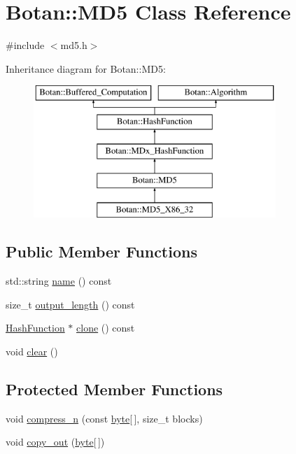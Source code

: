 \hypertarget{classBotan_1_1MD5}{\section{Botan\-:\-:M\-D5 Class Reference}
\label{classBotan_1_1MD5}
}


{\ttfamily \#include $<$md5.\-h$>$}

Inheritance diagram for Botan\-:\-:M\-D5\-:\begin{figure}[H]
\begin{center}
\leavevmode
\includegraphics[height=5.000000cm]{classBotan_1_1MD5}
\end{center}
\end{figure}
\subsection*{Public Member Functions}
\begin{DoxyCompactItemize}
\item 
std\-::string \hyperlink{classBotan_1_1MD5_af53e55e60b7a2ca37f19dbdfc9f40114}{name} () const 
\item 
size\-\_\-t \hyperlink{classBotan_1_1MD5_a04676964538b2daf2a412bc060e1f788}{output\-\_\-length} () const 
\item 
\hyperlink{classBotan_1_1HashFunction}{Hash\-Function} $\ast$ \hyperlink{classBotan_1_1MD5_a9a3f1641bbcbad160432dfb58c6c65b8}{clone} () const 
\item 
void \hyperlink{classBotan_1_1MD5_ad12def38224ac9ceff675d38bf3fd59f}{clear} ()
\end{DoxyCompactItemize}
\subsection*{Protected Member Functions}
\begin{DoxyCompactItemize}
\item 
void \hyperlink{classBotan_1_1MD5_a9c5b609b36ee314b28be2026447e85fe}{compress\-\_\-n} (const \hyperlink{namespaceBotan_a7d793989d801281df48c6b19616b8b84}{byte}\mbox{[}$\,$\mbox{]}, size\-\_\-t blocks)
\item 
void \hyperlink{classBotan_1_1MD5_a0adad09e624707d644a33dc5c6561977}{copy\-\_\-out} (\hyperlink{namespaceBotan_a7d793989d801281df48c6b19616b8b84}{byte}\mbox{[}$\,$\mbox{]})
\end{DoxyCompactItemize}
